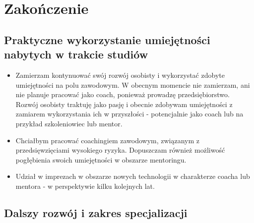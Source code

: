 \chapter{Zakończenie}

\section{Praktyczne wykorzystanie umiejętności nabytych w trakcie studiów}


\begin{itemize}
  \item Zamierzam kontynuować swój rozwój osobisty i wykorzystać zdobyte umiejętności na polu zawodowym. W obecnym momencie
    nie zamierzam, ani nie planuje pracować jako coach, ponieważ prowadzę przedsiębiorstwo. Rozwój osobisty traktuję jako pasję
    i obecnie zdobywam umiejętności z zamiarem wykorzystania ich w przyszłości - potencjalnie jako coach lub na przykład szkoleniowiec
    lub mentor.
  \item Chciałbym pracować coachingiem zawodowym, związanym z przedsięwzięciami wysokiego ryzyka. Dopuszczam również
    możliwość pogłębienia swoich umiejętności w obszarze mentoringu.
  \item Udział w imprezach w obszarze nowych technologii w charakterze coacha lub mentora - w perspektywie kilku kolejnych lat.
\end{itemize}

\section{Dalszy rozwój i zakres specjalizacji}
